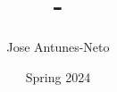 \documentclass[12pt,twoside]{article}
\title{\course-\assignment}
\author{Jose Antunes-Neto}
\date{Spring 2024}
\begin{document}
\maketitle

\problem

\clearpage

\clearpage
\end{document}
